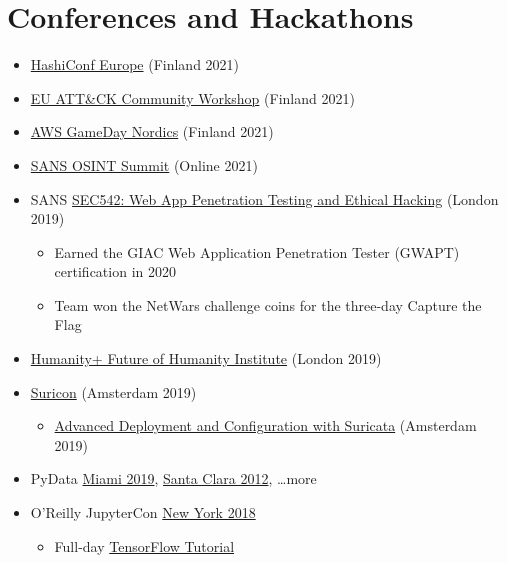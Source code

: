 \documentclass[12pt]{article}
\newenvironment{mitemize}
               {%
                 \setlength{\parskip}{3pt}
                 \setlength{\itemsep}{2.5pt plus 1pt}
                 \begin{itemize}}
               {\end{itemize}}
\begin{document}
\clearpage

\section*{Conferences and Hackathons} \hfill

\begin{mitemize}
\item \href{https://live.hashiconf.com/schedule}{HashiConf Europe} (Finland 2021)
\item \href{https://www.attack-community.org/event/}{EU ATT\&CK Community Workshop} (Finland 2021)
\item \href{https://aws-gameday-nordics.splashthat.com/}{AWS GameDay Nordics} (Finland 2021)
\item \href{https://www.sans.org/cyber-security-summit/archives/}{SANS OSINT Summit} (Online 2021)
\item SANS \href{https://www.sans.org/cyber-security-courses/web-app-penetration-testing-ethical-hacking/}{SEC542: Web App Penetration Testing and Ethical Hacking} (London 2019)
  \begin{mitemize}
    \item Earned the GIAC Web Application Penetration Tester (GWAPT) certification in 2020
    \item Team won the NetWars challenge coins for the three-day Capture the Flag
  \end{mitemize}
\item \href{https://humanityplus.org/events/transvision-2019/}{Humanity+ Future of Humanity Institute} (London 2019)
\item \href{https://suricon.net/suricon-2019-amsterdam/}{Suricon} (Amsterdam 2019)
  \begin{mitemize}
  \item \href{https://suricon.net/trainings/}{Advanced Deployment and Configuration with Suricata} (Amsterdam 2019)
\end{mitemize}
\item PyData \href{https://pydata.org/miami2019/}{Miami 2019}, \href{https://conferences.oreilly.com/strata/strata2012/public/schedule/detail/23166}{Santa Clara 2012}, \ldots more
\item O'Reilly JupyterCon \href{https://conferences.oreilly.com/jupyter/jup-ny}{New York 2018}
  \begin{mitemize}
    \item Full-day \href{https://conferences.oreilly.com/jupyter/jup-ny/public/schedule/detail/68192}{TensorFlow Tutorial}

\end{mitemize}
\end{mitemize}
\end{document}
